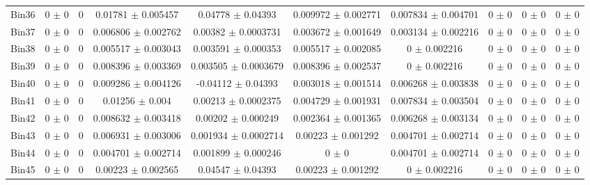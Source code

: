 \begin{tabular}{@{\extracolsep{4pt}}lccccccccc@{}}
     Bin36 & 0 $\pm$ 0 & 0 & 0.01781 $\pm$ 0.005457 & 0.04778 $\pm$ 0.04393 & 0.009972 $\pm$ 0.002771 & 0.007834 $\pm$ 0.004701 & 0 $\pm$ 0 & 0 $\pm$ 0 & 0 $\pm$ 0 \\ 
     Bin37 & 0 $\pm$ 0 & 0 & 0.006806 $\pm$ 0.002762 & 0.00382 $\pm$ 0.0003731 & 0.003672 $\pm$ 0.001649 & 0.003134 $\pm$ 0.002216 & 0 $\pm$ 0 & 0 $\pm$ 0 & 0 $\pm$ 0 \\ 
     Bin38 & 0 $\pm$ 0 & 0 & 0.005517 $\pm$ 0.003043 & 0.003591 $\pm$ 0.000353 & 0.005517 $\pm$ 0.002085 & 0 $\pm$ 0.002216 & 0 $\pm$ 0 & 0 $\pm$ 0 & 0 $\pm$ 0 \\ 
     Bin39 & 0 $\pm$ 0 & 0 & 0.008396 $\pm$ 0.003369 & 0.003505 $\pm$ 0.0003679 & 0.008396 $\pm$ 0.002537 & 0 $\pm$ 0.002216 & 0 $\pm$ 0 & 0 $\pm$ 0 & 0 $\pm$ 0 \\ 
     Bin40 & 0 $\pm$ 0 & 0 & 0.009286 $\pm$ 0.004126 & -0.04112 $\pm$ 0.04393 & 0.003018 $\pm$ 0.001514 & 0.006268 $\pm$ 0.003838 & 0 $\pm$ 0 & 0 $\pm$ 0 & 0 $\pm$ 0 \\ 
     Bin41 & 0 $\pm$ 0 & 0 & 0.01256 $\pm$ 0.004 & 0.00213 $\pm$ 0.0002375 & 0.004729 $\pm$ 0.001931 & 0.007834 $\pm$ 0.003504 & 0 $\pm$ 0 & 0 $\pm$ 0 & 0 $\pm$ 0 \\ 
     Bin42 & 0 $\pm$ 0 & 0 & 0.008632 $\pm$ 0.003418 & 0.00202 $\pm$ 0.000249 & 0.002364 $\pm$ 0.001365 & 0.006268 $\pm$ 0.003134 & 0 $\pm$ 0 & 0 $\pm$ 0 & 0 $\pm$ 0 \\ 
     Bin43 & 0 $\pm$ 0 & 0 & 0.006931 $\pm$ 0.003006 & 0.001934 $\pm$ 0.0002714 & 0.00223 $\pm$ 0.001292 & 0.004701 $\pm$ 0.002714 & 0 $\pm$ 0 & 0 $\pm$ 0 & 0 $\pm$ 0 \\ 
     Bin44 & 0 $\pm$ 0 & 0 & 0.004701 $\pm$ 0.002714 & 0.001899 $\pm$ 0.000246 & 0 $\pm$ 0 & 0.004701 $\pm$ 0.002714 & 0 $\pm$ 0 & 0 $\pm$ 0 & 0 $\pm$ 0 \\ 
     Bin45 & 0 $\pm$ 0 & 0 & 0.00223 $\pm$ 0.002565 & 0.04547 $\pm$ 0.04393 & 0.00223 $\pm$ 0.001292 & 0 $\pm$ 0.002216 & 0 $\pm$ 0 & 0 $\pm$ 0 & 0 $\pm$ 0 \\ 
\hline\hline
  \end{tabular}
